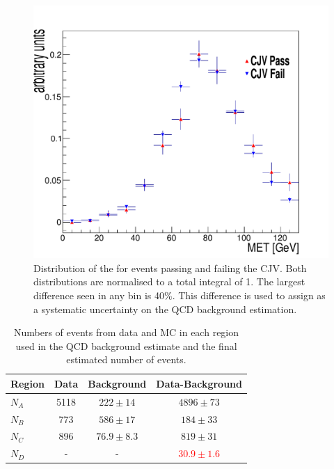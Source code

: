 \begin{figure}
  \includegraphics[width=1.2\largefigwidth]{plots/prompt/AN-12-403-figs/QCD3_CtrlLo_MET.pdf}
  \caption{Distribution of the \METnoMU for events passing and failing the \ac{CJV}. Both distributions are normalised to a total integral of 1. The largest difference seen in any bin is 40\%. This difference is used to assign as a systematic uncertainty on the \ac{QCD} background estimation.}
  \label{prompt:qcdmetcjv}
\end{figure}

\begin{table}
  \caption{Numbers of events from data and \ac{MC} in each region used in the \ac{QCD} background estimate and the final estimated number of events.}
  \label{tab:promptqcd}
  \begin{tabular}{lccc}
    \hline
    \hline
    Region & Data & Background & Data-Background \\
    \hline
    \hline
    $N_{A}$ & 5118 & $222\pm 14$ & $4896\pm 73$\\
    $N_{B}$ & 773  & $586\pm 17$ & $184 \pm 33$\\
    $N_{C}$ & 896  & $76.9\pm 8.3$ & $819\pm 31$\\
    \hline
    $N_{D}$ & - & - & \textcolor{red}{$30.9\pm 1.6$}\\
    \hline
    \hline
  \end{tabular}
\end{table}


